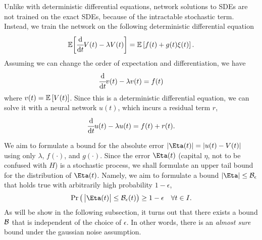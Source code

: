     Unlike with deterministic differential equations, network solutions to SDEs are not trained on the exact SDEs, because of the intractable stochastic term. 
    Instead, we train the network on the following deterministic differential equation
    \begin{equation}
    \mathbb{E}\bigg[\cfrac{\mathrm{d} }{\mathrm{d} t}V(t) - \lambda V(t)\bigg] = \mathbb{E}\left[f(t) + g(t) \xi(t)\right].
    \end{equation}
    Assuming we can change the order of expectation and differentiation, we have
    \begin{equation}
    \cfrac{\mathrm{d} }{\mathrm{d} t}v(t) - \lambda v(t) = f(t)
    \end{equation}
    where $v(t) = \mathbb{E}\left[V(t)\right]$. 
    Since this is a deterministic differential equation, we can solve it with a neural network $u(t)$, which incurs a residual term $r$,
    \begin{equation}\label{eq:linear-sde-network}
    \cfrac{\mathrm{d} }{\mathrm{d} t}u(t) - \lambda u(t) = f(t) + r(t).
    \end{equation}

    We aim to formulate a bound for the absolute error $|\Eta(t)| = |u(t) - V(t)|$ using only $\lambda$, $f(\cdot)$, and $g(\cdot)$. 
    Since the error $\Eta(t)$ (capital $\eta$, not to be confused with $H$) is a stochastic process, we shall formulate an upper tail bound for the distribution of $\Eta(t)$. 
    Namely, we aim to formulate a bound $|\Eta| \leq \Bound_\epsilon$ that holds true with arbitrarily high probability $1 - \epsilon$,
    \begin{equation}\label{eq:upper-tail-bound-goal}
        \P{\, \big|\Eta(t)\big| \leq \Bound_\epsilon(t)} \geq 1 - \epsilon \quad \forall t \in I.
    \end{equation}
    As will be show in the following subsection, it turns out that there exists a bound $\mathcal{B}$ that is independent of the choice of $\epsilon$.
    In other words, there is an \textit{almost sure} bound under the gaussian noise assumption.
